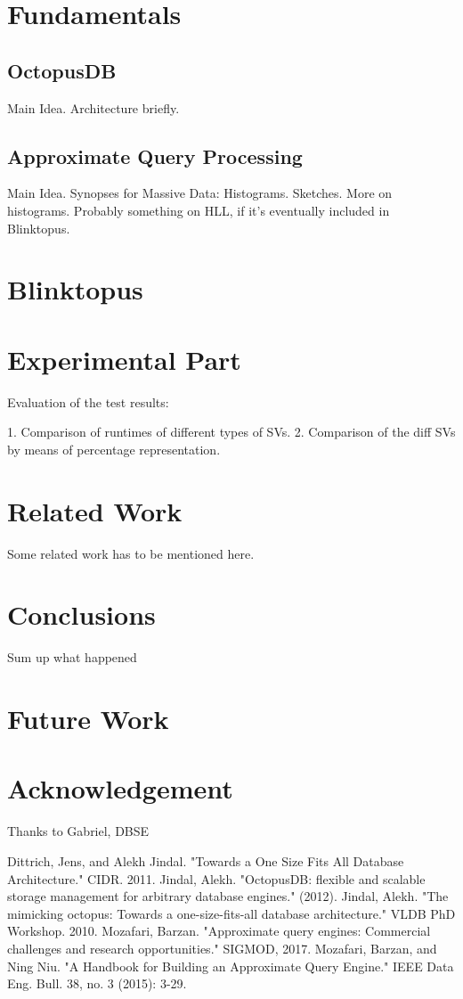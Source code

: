 \documentclass[10pt, conference, compsocconf]{IEEEtran}
\begin{document}
\section{Fundamentals}
\subsection{OctopusDB}
Main Idea. Architecture briefly.

\subsection{Approximate Query Processing}
Main Idea. Synopses for Massive Data: Histograms. Sketches.
More on histograms. 
Probably something on HLL, if it's eventually included in Blinktopus.

\section{Blinktopus}

\section{Experimental Part}
Evaluation of the test results:
 
1. Comparison of runtimes of different types of SVs.
2. Comparison of the diff SVs by means of percentage representation.

\section{Related Work}
Some related work has to be mentioned here.

\section{Conclusions}
Sum up what happened

\section{Future Work}


\section*{Acknowledgement}
Thanks to Gabriel, DBSE

\begin{thebibliography}{1}

Dittrich, Jens, and Alekh Jindal. "Towards a One Size Fits All Database Architecture." CIDR. 2011.
Jindal, Alekh. "OctopusDB: flexible and scalable storage management for arbitrary database engines." (2012).
Jindal, Alekh. "The mimicking octopus: Towards a one-size-fits-all database architecture." VLDB PhD Workshop. 2010.
Mozafari, Barzan. "Approximate query engines: Commercial challenges and research opportunities." SIGMOD, 2017.
Mozafari, Barzan, and Ning Niu. "A Handbook for Building an Approximate Query Engine." IEEE Data Eng.
Bull. 38, no. 3 (2015): 3-29.
\end{thebibliography}
\end{document}

